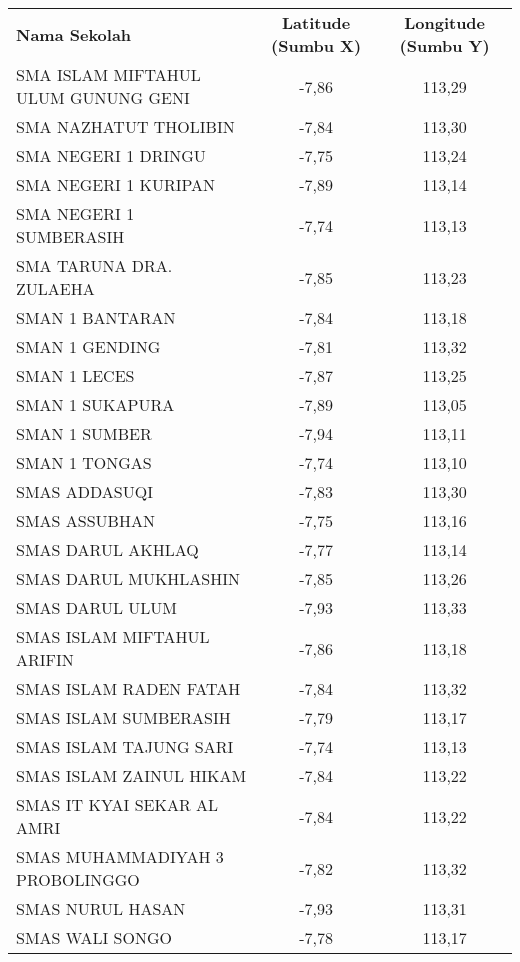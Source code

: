 \begin{table}[H]
\scriptsize
\centering
\begin{tabular}{lcc}
\rowcolor[HTML]{4472C4} 
{\color[HTML]{FFFFFF} \textbf{Nama   Sekolah}} & {\color[HTML]{FFFFFF} \textbf{Latitude (Sumbu X)}} & {\color[HTML]{FFFFFF} \textbf{Longitude (Sumbu Y)}} \\
\rowcolor[HTML]{D9E1F2} 
SMA ISLAM MIFTAHUL ULUM GUNUNG   GENI & -7,86 & 113,29 \\
SMA   NAZHATUT THOLIBIN               & -7,84 & 113,30 \\
\rowcolor[HTML]{D9E1F2} 
SMA NEGERI 1 DRINGU                   & -7,75 & 113,24 \\
SMA   NEGERI 1 KURIPAN                & -7,89 & 113,14 \\
\rowcolor[HTML]{D9E1F2} 
SMA NEGERI 1 SUMBERASIH               & -7,74 & 113,13 \\
SMA   TARUNA DRA. ZULAEHA             & -7,85 & 113,23 \\
\rowcolor[HTML]{D9E1F2} 
SMAN 1 BANTARAN                       & -7,84 & 113,18 \\
SMAN   1 GENDING                      & -7,81 & 113,32 \\
\rowcolor[HTML]{D9E1F2} 
SMAN 1 LECES                          & -7,87 & 113,25 \\
SMAN   1 SUKAPURA                     & -7,89 & 113,05 \\
\rowcolor[HTML]{D9E1F2} 
SMAN 1 SUMBER                         & -7,94 & 113,11 \\
SMAN   1 TONGAS                       & -7,74 & 113,10 \\
\rowcolor[HTML]{D9E1F2} 
SMAS ADDASUQI                         & -7,83 & 113,30 \\
SMAS   ASSUBHAN                       & -7,75 & 113,16 \\
\rowcolor[HTML]{D9E1F2} 
SMAS DARUL AKHLAQ                     & -7,77 & 113,14 \\
SMAS   DARUL MUKHLASHIN               & -7,85 & 113,26 \\
\rowcolor[HTML]{D9E1F2} 
SMAS DARUL ULUM                       & -7,93 & 113,33 \\
SMAS   ISLAM MIFTAHUL ARIFIN          & -7,86 & 113,18 \\
\rowcolor[HTML]{D9E1F2} 
SMAS ISLAM RADEN FATAH                & -7,84 & 113,32 \\
SMAS   ISLAM SUMBERASIH               & -7,79 & 113,17 \\
\rowcolor[HTML]{D9E1F2} 
SMAS ISLAM TAJUNG SARI                & -7,74 & 113,13 \\
SMAS   ISLAM ZAINUL HIKAM             & -7,84 & 113,22 \\
\rowcolor[HTML]{D9E1F2} 
SMAS IT KYAI SEKAR AL AMRI            & -7,84 & 113,22 \\
SMAS   MUHAMMADIYAH 3 PROBOLINGGO     & -7,82 & 113,32 \\
\rowcolor[HTML]{D9E1F2} 
SMAS NURUL HASAN                      & -7,93 & 113,31 \\
SMAS   WALI SONGO                     & -7,78 & 113,17
\end{tabular}
\end{table}